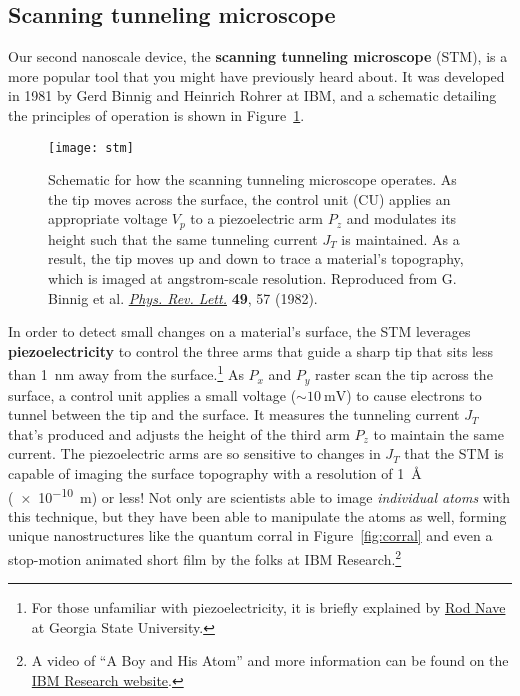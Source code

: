 
\subsection{Scanning tunneling microscope}
Our second nanoscale device, the \textbf{scanning tunneling microscope} (STM), is a more popular tool that you might have previously heard about. It was developed in 1981 by Gerd Binnig and Heinrich Rohrer at IBM, and a schematic detailing the principles of operation is shown in Figure~\ref{fig:stm}.

\begin{figure}[!h]
	\centering
	\texttt{[image: stm]}
	\caption{Schematic for how the scanning tunneling microscope operates. As the tip moves across the surface, the control unit (CU) applies an appropriate voltage $V_p$ to a piezoelectric arm $P_z$ and modulates its height such that the same tunneling current $J_T$ is maintained. As a result, the tip moves up and down to trace a material's topography, which is imaged at angstrom-scale resolution. Reproduced from G. Binnig et al. \href{https://journals.aps.org/prl/abstract/10.1103/PhysRevLett.49.57}{\emph{Phys. Rev. Lett.}} \textbf{49}, 57 (1982).}
	\label{fig:stm}
\end{figure}

In order to detect small changes on a material's surface, the STM leverages \textbf{piezoelectricity} to control the three arms that guide a sharp tip that sits less than \SI{1}{\nano\meter} away from the surface.\footnote{For those unfamiliar with piezoelectricity, it is briefly explained by \href{http://hyperphysics.phy-astr.gsu.edu/hbase/Solids/piezo.html}{Rod Nave} at Georgia State University.} As $P_x$ and $P_y$ raster scan the tip across the surface, a control unit applies a small voltage ($\sim\SI{10}{\milli\volt}$) to cause electrons to tunnel between the tip and the surface. It measures the tunneling current $J_T$ that's produced and adjusts the height of the third arm $P_z$ to maintain the same current. The piezoelectric arms are so sensitive to changes in $J_T$ that the STM is capable of imaging the surface topography with a resolution of \SI{1}{\angstrom} (\SI{e-10}{\meter}) or less! Not only are scientists able to image \emph{individual atoms} with this technique, but they have been able to manipulate the atoms as well, forming unique nanostructures like the quantum corral in Figure~\ref{fig:corral} and even a stop-motion animated short film by the folks at IBM Research.\footnote{A video of ``A Boy and His Atom'' and more information can be found on the \href{http://www.research.ibm.com/articles/madewithatoms.shtml\#fbid=9xTkVKSpT3k}{IBM Research website}.}

